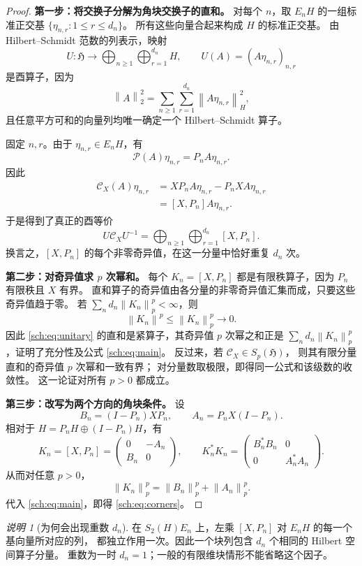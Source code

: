 \documentclass[UTF8,11pt,a4paper,fontset=fandol]{ctexart}
\theoremstyle{remark}
\newtheorem{remark}[theorem]{说明}
\newcommand{\PP}{\mathcal P}
\newcommand{\CC}{\mathcal C}
\newcommand{\norm}[1]{\left\lVert #1\right\rVert}
\newcommand{\HS}{\mathfrak H}
\numberwithin{equation}{section}
\begin{document}
\begin{proof}
\textbf{第一步：将交换子分解为角块交换子的直和。}
对每个 $n$，取 $E_nH$ 的一组标准正交基
$\{\eta_{n,r}:1\leq r\leq d_n\}$。
所有这些向量合起来构成 $H$ 的标准正交基。
由 Hilbert--Schmidt 范数的列表示，映射
\[
 U:\HS\longrightarrow\bigoplus_{n\geq1}\bigoplus_{r=1}^{d_n}H,
 \qquad U(A)=(A\eta_{n,r})_{n,r}
\]
是酉算子，因为
\[
 \norm A_2^2=\sum_{n\geq1}\sum_{r=1}^{d_n}\norm{A\eta_{n,r}}_H^2,
\]
且任意平方可和的向量列均唯一确定一个 Hilbert--Schmidt 算子。

固定 $n,r$。由于 $\eta_{n,r}\in E_nH$，有
\[
 \PP(A)\eta_{n,r}=P_nA\eta_{n,r}.
\]
因此
\begin{align*}
 \CC_X(A)\eta_{n,r}
 &=XP_nA\eta_{n,r}-P_nXA\eta_{n,r}\\
 &=[X,P_n]A\eta_{n,r}.
\end{align*}
于是得到了真正的酉等价
\begin{equation}\label{sch:eq:unitary}
 \boxed{\quad
 U\CC_XU^{-1}
 =\bigoplus_{n\geq1}\bigoplus_{r=1}^{d_n}[X,P_n].
 \quad}
\end{equation}
换言之，$[X,P_n]$ 的每个非零奇异值，在这一分量中恰好重复 $d_n$ 次。

\medskip
\textbf{第二步：对奇异值求 $p$ 次幂和。}
每个 $K_n=[X,P_n]$ 都是有限秩算子，因为 $P_n$ 有限秩且 $X$ 有界。
直和算子的奇异值由各分量的非零奇异值汇集而成，只要这些奇异值趋于零。
若 $\sum_nd_n\norm{K_n}_p^p<\infty$，则
\[
 \norm{K_n}^p\leq\norm{K_n}_p^p\longrightarrow0.
\]
因此 \eqref{sch:eq:unitary} 的直和是紧算子，其奇异值 $p$ 次幂之和正是
$\sum_nd_n\norm{K_n}_p^p$，证明了充分性及公式 \eqref{sch:eq:main}。
反过来，若 $\CC_X\in S_p(\HS)$，
则其有限分量直和的奇异值 $p$ 次幂和一致有界；
对分量数取极限，即得同一公式和该级数的收敛性。
这一论证对所有 $p>0$ 都成立。

\medskip
\textbf{第三步：改写为两个方向的角块条件。}
设
\[
 B_n=(I-P_n)XP_n,
 \qquad A_n=P_nX(I-P_n).
\]
相对于 $H=P_nH\oplus(I-P_n)H$，有
\[
 K_n=[X,P_n]=\begin{pmatrix}0&-A_n\\B_n&0\end{pmatrix},
 \qquad
 K_n^*K_n=\begin{pmatrix}B_n^*B_n&0\\0&A_n^*A_n\end{pmatrix}.
\]
从而对任意 $p>0$，
\[
 \norm{K_n}_p^p=\norm{B_n}_p^p+\norm{A_n}_p^p.
\]
代入 \eqref{sch:eq:main}，即得 \eqref{sch:eq:corners}。
\end{proof}

\begin{remark}[为何会出现重数 $d_n$]
在 $S_2(H)E_n$ 上，左乘 $[X,P_n]$ 对 $E_nH$ 的每一个基向量所对应的列，
都独立作用一次。因此一个块列包含 $d_n$ 个相同的 Hilbert 空间算子分量。
重数为一时 $d_n=1$；一般的有限维块情形不能省略这个因子。
\end{remark}
\end{document}
